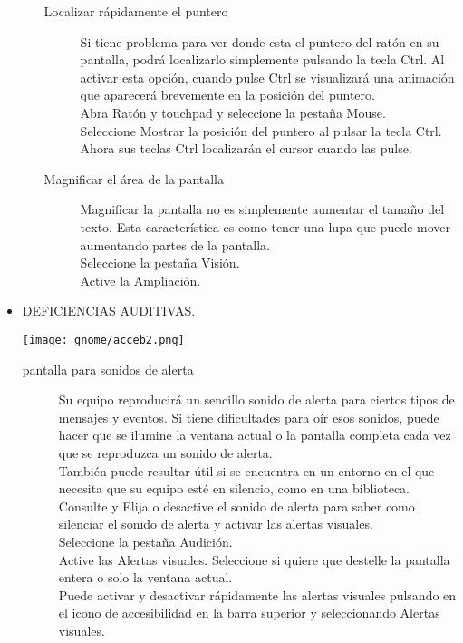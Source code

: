 \begin{itemize}
\begin{itemize}
\begin{description}
	\item[Localizar rápidamente el puntero] Si tiene problema para ver donde esta el puntero del ratón en su pantalla, podrá localizarlo simplemente pulsando la tecla Ctrl. Al activar esta opción, cuando pulse Ctrl se visualizará una animación que aparecerá brevemente en la posición del puntero.\\
Abra Ratón y touchpad y seleccione la pestaña Mouse.\\
Seleccione Mostrar la posición del puntero al pulsar la tecla Ctrl.\\
Ahora sus teclas Ctrl localizarán el cursor cuando las pulse.
	\item[Magnificar el área de la pantalla] Magnificar la pantalla no es simplemente aumentar el tamaño del texto. Esta característica es como tener una lupa que puede mover aumentando partes de la pantalla.\\
Seleccione la pestaña Visión.\\
Active la Ampliación.
\end{description}
\end{itemize}
\newpage
\item DEFICIENCIAS AUDITIVAS.
\begin{center}
\texttt{[image: gnome/acceb2.png]} 
\end{center}
	\begin{description}
		\item [pantalla para sonidos de alerta] Su equipo reproducirá un sencillo sonido de alerta para ciertos tipos de mensajes y eventos. Si tiene dificultades para oír esos sonidos, puede hacer que se ilumine la ventana actual o la pantalla completa cada vez que se reproduzca un sonido de alerta.\\
También puede resultar útil si se encuentra en un entorno en el que necesita que su equipo esté en silencio, como en una biblioteca. Consulte y Elija o desactive el sonido de alerta para saber como silenciar el sonido de alerta y activar las alertas visuales.\\
Seleccione la pestaña Audición.\\
Active las Alertas visuales. Seleccione si quiere que destelle la pantalla entera o solo la ventana actual.\\
Puede activar y desactivar rápidamente las alertas visuales pulsando en el icono de accesibilidad en la barra superior y seleccionando Alertas visuales.
	\end{description}
	

\end{itemize}
